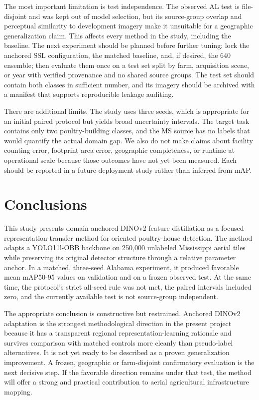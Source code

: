 \documentclass[preprint,12pt,authoryear]{elsarticle}
\newcommand{\metric}{mAP50-95}
\begin{document}
The most important limitation is test independence. The observed AL test is file-disjoint and was kept out of model selection, but its source-group overlap and perceptual similarity to development imagery make it unsuitable for a geographic generalization claim. This affects every method in the study, including the baseline. The next experiment should be planned before further tuning: lock the anchored SSL configuration, the matched baseline, and, if desired, the 640 ensemble; then evaluate them once on a test set split by farm, acquisition scene, or year with verified provenance and no shared source groups. The test set should contain both classes in sufficient number, and its imagery should be archived with a manifest that supports reproducible leakage auditing.

There are additional limits. The study uses three seeds, which is appropriate for an initial paired protocol but yields broad uncertainty intervals. The target task contains only two poultry-building classes, and the MS source has no labels that would quantify the actual domain gap. We also do not make claims about facility counting error, footprint area error, geographic completeness, or runtime at operational scale because those outcomes have not yet been measured. Each should be reported in a future deployment study rather than inferred from mAP.

\section{Conclusions}
\label{sec:conclusion}

This study presents domain-anchored DINOv2 feature distillation as a focused representation-transfer method for oriented poultry-house detection. The method adapts a YOLO11l-OBB backbone on 250,000 unlabeled Mississippi aerial tiles while preserving its original detector structure through a relative parameter anchor. In a matched, three-seed Alabama experiment, it produced favorable mean \metric{} values on validation and on a frozen observed test. At the same time, the protocol's strict all-seed rule was not met, the paired intervals included zero, and the currently available test is not source-group independent.

The appropriate conclusion is constructive but restrained. Anchored DINOv2 adaptation is the strongest methodological direction in the present project because it has a transparent regional representation-learning rationale and survives comparison with matched controls more cleanly than pseudo-label alternatives. It is not yet ready to be described as a proven generalization improvement. A frozen, geographic or farm-disjoint confirmatory evaluation is the next decisive step. If the favorable direction remains under that test, the method will offer a strong and practical contribution to aerial agricultural infrastructure mapping.
\end{document}

